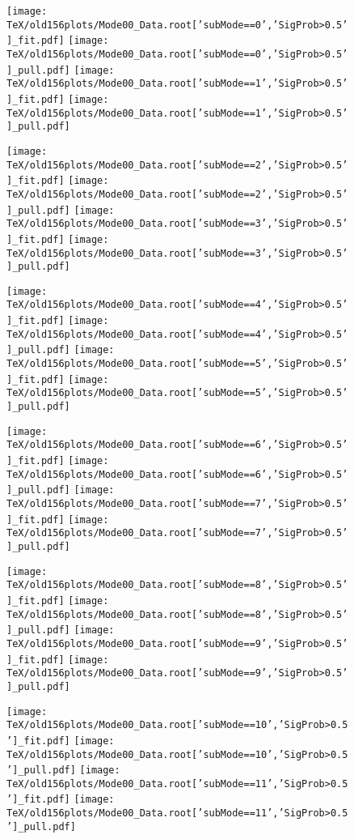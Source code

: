 \documentclass{article}
\begin{document}
\begin{figure}[p!]
\begin{center}
\texttt{[image: TeX/old156plots/Mode00\_Data.root['subMode==0','SigProb>0.5']\_fit.pdf]}
\texttt{[image: TeX/old156plots/Mode00\_Data.root['subMode==0','SigProb>0.5']\_pull.pdf]}
\texttt{[image: TeX/old156plots/Mode00\_Data.root['subMode==1','SigProb>0.5']\_fit.pdf]}
\texttt{[image: TeX/old156plots/Mode00\_Data.root['subMode==1','SigProb>0.5']\_pull.pdf]}

\texttt{[image: TeX/old156plots/Mode00\_Data.root['subMode==2','SigProb>0.5']\_fit.pdf]}
\texttt{[image: TeX/old156plots/Mode00\_Data.root['subMode==2','SigProb>0.5']\_pull.pdf]}
\texttt{[image: TeX/old156plots/Mode00\_Data.root['subMode==3','SigProb>0.5']\_fit.pdf]}
\texttt{[image: TeX/old156plots/Mode00\_Data.root['subMode==3','SigProb>0.5']\_pull.pdf]}

\texttt{[image: TeX/old156plots/Mode00\_Data.root['subMode==4','SigProb>0.5']\_fit.pdf]}
\texttt{[image: TeX/old156plots/Mode00\_Data.root['subMode==4','SigProb>0.5']\_pull.pdf]}
\texttt{[image: TeX/old156plots/Mode00\_Data.root['subMode==5','SigProb>0.5']\_fit.pdf]}
\texttt{[image: TeX/old156plots/Mode00\_Data.root['subMode==5','SigProb>0.5']\_pull.pdf]}

\texttt{[image: TeX/old156plots/Mode00\_Data.root['subMode==6','SigProb>0.5']\_fit.pdf]}
\texttt{[image: TeX/old156plots/Mode00\_Data.root['subMode==6','SigProb>0.5']\_pull.pdf]}
\texttt{[image: TeX/old156plots/Mode00\_Data.root['subMode==7','SigProb>0.5']\_fit.pdf]}
\texttt{[image: TeX/old156plots/Mode00\_Data.root['subMode==7','SigProb>0.5']\_pull.pdf]}

\texttt{[image: TeX/old156plots/Mode00\_Data.root['subMode==8','SigProb>0.5']\_fit.pdf]}
\texttt{[image: TeX/old156plots/Mode00\_Data.root['subMode==8','SigProb>0.5']\_pull.pdf]}
\texttt{[image: TeX/old156plots/Mode00\_Data.root['subMode==9','SigProb>0.5']\_fit.pdf]}
\texttt{[image: TeX/old156plots/Mode00\_Data.root['subMode==9','SigProb>0.5']\_pull.pdf]}

\texttt{[image: TeX/old156plots/Mode00\_Data.root['subMode==10','SigProb>0.5']\_fit.pdf]}
\texttt{[image: TeX/old156plots/Mode00\_Data.root['subMode==10','SigProb>0.5']\_pull.pdf]}
\texttt{[image: TeX/old156plots/Mode00\_Data.root['subMode==11','SigProb>0.5']\_fit.pdf]}
\texttt{[image: TeX/old156plots/Mode00\_Data.root['subMode==11','SigProb>0.5']\_pull.pdf]}


\end{center}
\end{figure}
\end{document}
